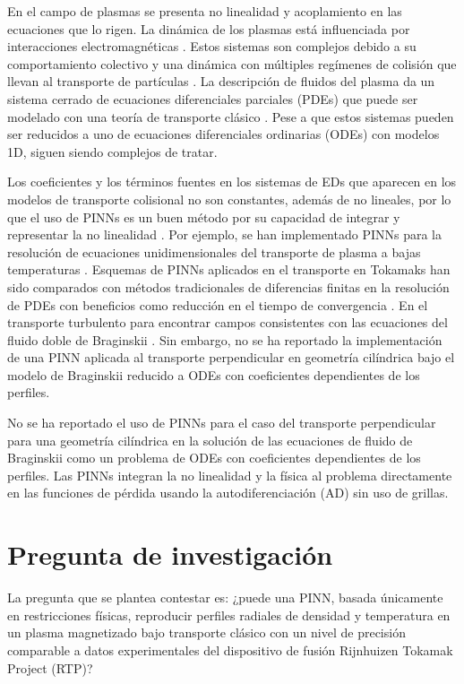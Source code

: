 En el campo de plasmas se presenta no linealidad y acoplamiento en las ecuaciones que lo rigen. La dinámica de los plasmas está influenciada por interacciones electromagnéticas \cite{helander2005}. Estos sistemas son complejos debido a su comportamiento colectivo y una dinámica con múltiples regímenes de colisión que llevan al transporte de partículas \cite{goldston1995}. La descripción de fluidos del plasma da un sistema cerrado de ecuaciones diferenciales parciales (PDEs) que puede ser modelado con  una teoría de transporte clásico \cite{freidberg2014}. Pese a que estos sistemas pueden ser reducidos a uno de ecuaciones diferenciales ordinarias (ODEs) con modelos 1D, siguen siendo complejos de tratar\cite{lechte2002, alves2018}.

Los coeficientes y los términos fuentes en los sistemas de EDs que aparecen en los modelos de transporte colisional no son constantes, además de no lineales, por lo que el uso de PINNs es un buen método por su capacidad de integrar y representar la no linealidad \cite{zhong2022}. Por ejemplo, se han implementado PINNs para la resolución de ecuaciones unidimensionales del transporte de plasma a bajas temperaturas \cite{zhong2022, trieschmann2023}. Esquemas de PINNs aplicados en el transporte en Tokamaks han sido comparados con métodos tradicionales de diferencias finitas en la resolución de PDEs con beneficios como reducción en el tiempo de convergencia \cite{seo2024}. En el transporte turbulento para encontrar campos consistentes con las ecuaciones del fluido doble de Braginskii \cite{mathews2021}. Sin embargo, no se ha reportado la implementación de una PINN aplicada al transporte perpendicular en geometría cilíndrica bajo el modelo de Braginskii reducido a ODEs con coeficientes dependientes de los perfiles.

No se ha reportado el uso de PINNs para el caso del transporte perpendicular para una geometría cilíndrica en la solución de las ecuaciones de fluido de Braginskii como un problema de ODEs con coeficientes dependientes de los perfiles. Las PINNs integran la no linealidad y la física al problema directamente en las funciones de pérdida usando la autodiferenciación (AD) sin uso de grillas. 
\section{Pregunta de investigación}
La pregunta que se plantea contestar es: ¿puede una PINN, basada únicamente en restricciones físicas, reproducir perfiles radiales de densidad y temperatura en un plasma magnetizado bajo transporte clásico con un nivel de precisión comparable a datos experimentales del dispositivo de fusión Rijnhuizen Tokamak Project (RTP)?
